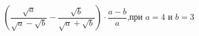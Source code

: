 \begin{ex}[type=calculate_expression]
	\begin{condition}
		\( \left( \dfrac{\sqrt{a}}{\sqrt{a}-\sqrt{b}}-\dfrac{\sqrt{b}}{\sqrt{a}+\sqrt{b}} \right)\cdot\dfrac{a-b}{a} \),\quad при \( a=4 \) и \( b=3 \)
	\end{condition}
\end{ex}